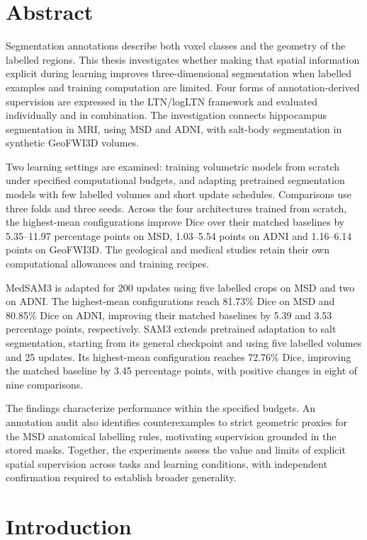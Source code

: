 \documentclass[12pt,a4paper]{article}
\begin{document}
\section*{Abstract}

Segmentation annotations describe both voxel classes and the geometry of
the labelled regions. This thesis investigates whether making that spatial
information explicit during learning improves three-dimensional
segmentation when labelled examples and training computation are limited.
Four forms of annotation-derived supervision are expressed in the
LTN/logLTN framework and evaluated individually and in combination.
The investigation connects hippocampus segmentation in MRI, using MSD
and ADNI, with salt-body segmentation in synthetic GeoFWI3D volumes.

Two learning settings are examined: training volumetric models from
scratch under specified computational budgets, and adapting pretrained
segmentation models with few labelled volumes and short update schedules.
Comparisons use three folds and three seeds. Across the four architectures
trained from scratch, the highest-mean configurations improve Dice over
their matched baselines by 5.35--11.97 percentage points on MSD,
1.03--5.54 points on ADNI and 1.16--6.14 points on GeoFWI3D.
The geological and medical studies retain their own computational
allowances and training recipes.

MedSAM3 is adapted for 200 updates using five labelled crops on MSD and
two on ADNI. The highest-mean configurations reach 81.73\% Dice on MSD
and 80.85\% Dice on ADNI,
improving their matched baselines by 5.39 and 3.53 percentage points,
respectively. SAM3 extends pretrained adaptation to salt segmentation,
starting from its general checkpoint and using five labelled volumes
and 25 updates. Its highest-mean configuration reaches 72.76\% Dice,
improving the matched baseline by 3.45 percentage points, with positive
changes in eight of nine comparisons.

The findings characterize performance within the specified budgets.
An annotation audit also identifies
counterexamples to strict geometric proxies for the MSD anatomical
labelling rules, motivating supervision grounded in the stored masks.
Together, the experiments assess the value and limits of explicit spatial
supervision across tasks and learning conditions, with independent
confirmation required to establish broader generality.

\clearpage
\setcounter{tocdepth}{2}
\tableofcontents
\clearpage
\section{Introduction}\label{sec:introduction}
\label{sec:motivation}\label{sec:research-questions}
\end{document}
